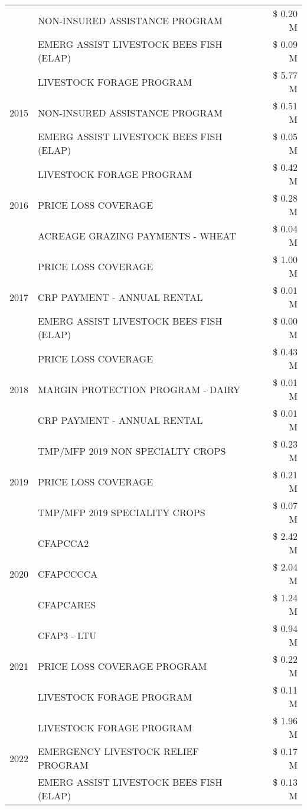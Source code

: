 \begin{tabular}{llr}
 & NON-INSURED ASSISTANCE PROGRAM & \$ 0.20 M \\
 & EMERG ASSIST LIVESTOCK BEES FISH (ELAP) & \$ 0.09 M \\
\cline{1-3}
\multirow[t]{3}{*}{2015} & LIVESTOCK FORAGE PROGRAM & \$ 5.77 M \\
 & NON-INSURED ASSISTANCE PROGRAM & \$ 0.51 M \\
 & EMERG ASSIST LIVESTOCK BEES FISH (ELAP) & \$ 0.05 M \\
\cline{1-3}
\multirow[t]{3}{*}{2016} & LIVESTOCK FORAGE PROGRAM & \$ 0.42 M \\
 & PRICE LOSS COVERAGE & \$ 0.28 M \\
 & ACREAGE GRAZING PAYMENTS - WHEAT & \$ 0.04 M \\
\cline{1-3}
\multirow[t]{3}{*}{2017} & PRICE LOSS COVERAGE & \$ 1.00 M \\
 & CRP PAYMENT - ANNUAL RENTAL & \$ 0.01 M \\
 & EMERG ASSIST LIVESTOCK BEES FISH (ELAP) & \$ 0.00 M \\
\cline{1-3}
\multirow[t]{3}{*}{2018} & PRICE LOSS COVERAGE & \$ 0.43 M \\
 & MARGIN PROTECTION PROGRAM - DAIRY & \$ 0.01 M \\
 & CRP PAYMENT - ANNUAL RENTAL & \$ 0.01 M \\
\cline{1-3}
\multirow[t]{3}{*}{2019} & TMP/MFP 2019 NON SPECIALTY CROPS & \$ 0.23 M \\
 & PRICE LOSS COVERAGE & \$ 0.21 M \\
 & TMP/MFP 2019 SPECIALITY CROPS & \$ 0.07 M \\
\cline{1-3}
\multirow[t]{3}{*}{2020} & CFAPCCA2 & \$ 2.42 M \\
 & CFAPCCCCA & \$ 2.04 M \\
 & CFAPCARES & \$ 1.24 M \\
\cline{1-3}
\multirow[t]{3}{*}{2021} & CFAP3 - LTU & \$ 0.94 M \\
 & PRICE LOSS COVERAGE PROGRAM & \$ 0.22 M \\
 & LIVESTOCK FORAGE PROGRAM & \$ 0.11 M \\
\cline{1-3}
\multirow[t]{3}{*}{2022} & LIVESTOCK FORAGE PROGRAM & \$ 1.96 M \\
 & EMERGENCY LIVESTOCK RELIEF PROGRAM & \$ 0.17 M \\
 & EMERG ASSIST LIVESTOCK BEES FISH (ELAP) & \$ 0.13 M \\
\cline{1-3}
\bottomrule
\end{tabular}

